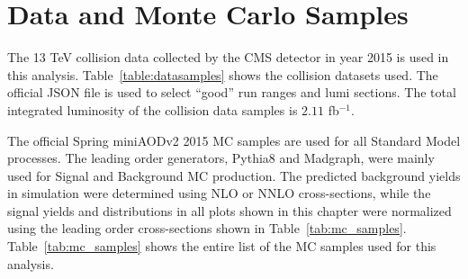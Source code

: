 \section{Data and Monte Carlo Samples}\label{sec:samples}


The 13 TeV collision data collected by the CMS detector in year 2015 is used in this analysis. Table~\ref{table:datasamples} shows the collision datasets used. 
 The official JSON file is used to select ``good'' run ranges and lumi sections. The total integrated luminosity of the collision data samples is $2.11$ fb$^{-1}$.

The official Spring miniAODv2 2015 MC samples are used for all Standard Model processes. The leading order generators, {\sc Pythia8} and {\sc Madgraph}, were 
mainly used for Signal and Background MC production. The predicted background yields in simulation were determined using NLO or NNLO cross-sections, while the 
signal yields and distributions in all plots shown in this chapter were normalized using the leading order cross-sections shown in Table~\ref{tab:mc_samples}. 
Table~\ref{tab:mc_samples} shows the entire list of the MC samples used for this analysis. 

